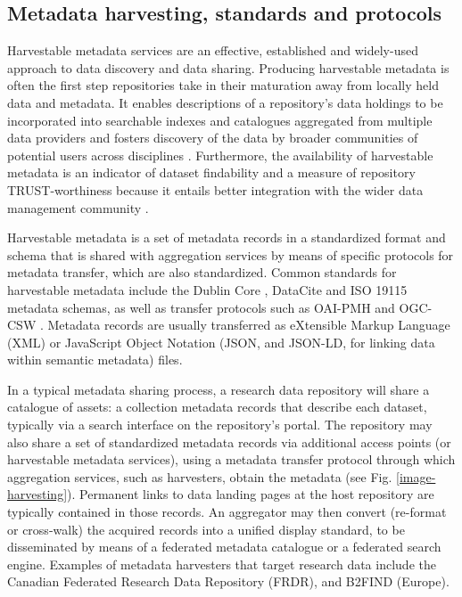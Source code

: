\documentclass{interact}
\begin{document}
\subsection*{Metadata harvesting, standards and protocols}\label{intro-harvesting}
 Harvestable metadata services are an effective, established and widely-used approach to data discovery and data sharing. Producing harvestable metadata is often the first step repositories take in their maturation away from locally held data and metadata. It enables descriptions of a repository’s data holdings to be incorporated into searchable indexes and catalogues aggregated from multiple data providers and fosters discovery of the data by broader communities of potential users across disciplines \parencite{lokers_analysis_2016, valentine_earthcube_2020}. Furthermore, the availability of harvestable metadata is an indicator of dataset findability \parencite{coretrustseal_coretrustseal_2019, fair_data_maturity_model_wg_fair_2020} and a measure of repository TRUST-worthiness because it entails better integration with the wider data management community \parencite[3]{lin_trust_2020}. 

Harvestable metadata is a set of metadata records in a standardized format and schema that is shared with aggregation services by means of specific protocols for metadata transfer, which are also standardized. Common standards for harvestable metadata include the Dublin Core \parencite{dcmi_dublin_2020}, DataCite \parencite{datacite_metadata_working_group_datacite_2019} and ISO 19115 \parencite{iso_iso_2019} metadata schemas, as well as transfer protocols such as OAI-PMH \parencite{lagoze_open_2015} and OGC-CSW \parencite{nebert_ogc_2016}. Metadata records are usually transferred as eXtensible Markup Language (XML) or JavaScript Object Notation (JSON, and JSON-LD, for linking data within semantic metadata) files. 

In a typical metadata sharing process, a research data repository will share a catalogue of assets: a collection metadata records that describe each dataset, typically via a search interface on the repository's portal. The repository may also share a set of standardized metadata records via additional access points (or harvestable metadata services), using a metadata transfer protocol through which aggregation services, such as harvesters, obtain the metadata (see Fig. \ref{image-harvesting}). Permanent links to data landing pages at the host repository are typically contained in those records. An aggregator may then convert (re-format or cross-walk) the acquired records into a unified display standard, to be disseminated by means of a federated metadata catalogue or a federated search engine. Examples of metadata harvesters that target research data include the Canadian Federated Research Data Repository (FRDR), and B2FIND (Europe).
\end{document}
